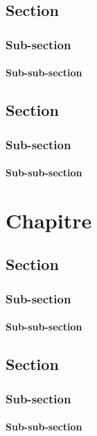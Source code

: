 \documentclass[twoside,titlepage,paper=a4,fontsize=12pt,numbers=noenddot,cleardoublepage=empty,BCOR=5mm,openright]{scrreprt}
\begin{document}
\section{Section}
\subsection{Sub-section}
\subsubsection{Sub-sub-section}

\section{Section}
\subsection{Sub-section}
\subsubsection{Sub-sub-section}

\chapter{Chapitre}

\section{Section}
\subsection{Sub-section}
\subsubsection{Sub-sub-section}

\section{Section}
\subsection{Sub-section}
\subsubsection{Sub-sub-section}
\end{document}
